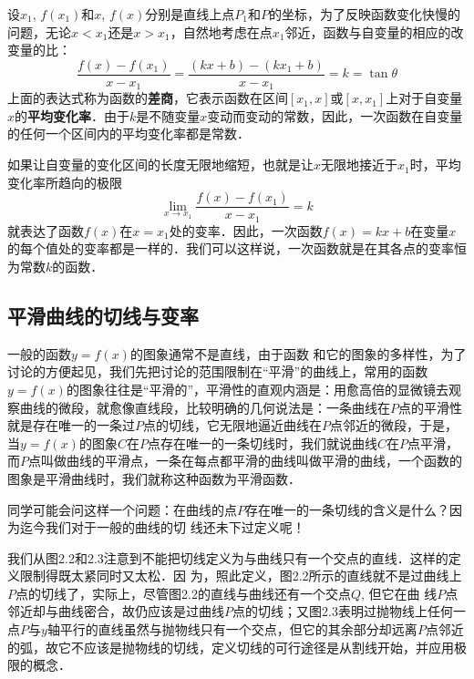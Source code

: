 设$x_1$, $f(x_1)$和$x$, $f(x)$分别是直线上点$P_1$和$P$的坐标，为了反映函数变化快慢的问题，无论$x<x_1$还是$x>x_1$，自然地考虑在点$x_1$邻近，函数与自变量的相应的改变量的比：
\[\frac{f(x)-f(x_1)}{x-x_1}=\frac{(kx+b)-(kx_1+b)}{x-x_1}=k=\tan\theta\]
上面的表达式称为函数的\textbf{差商}，它表示函数在区间$[x_1,x]$或$[x,x_1]$上对于自变量$x$的\textbf{平均变化率}．由于$k$是不随变量$x$变动而变动的常数，因此，一次函数在自变量的任何一个区间内的平均变化率都是常数．

如果让自变量的变化区间的长度无限地缩短，也就是让$x$无限地接近于$x_1$时，平均变化率所趋向的极限
\[\lim_{x\to x_1} \frac{f (x) -f (x_1)}{x-x_1} =k\]
就表达了函数$f(x)$在$x=x_1$处的变率．因此，一次函数$f(x)=kx+b$在变量$x$的每个值处的变率都是一样的．我们可以这样说，一次函数就是在其各点的变率恒为常数$k$的函数．

\subsection{平滑曲线的切线与变率}
一般的函数$y=f(x)$的图象通常不是直线，由于函数
和它的图象的多样性，为了讨论的方便起见，我们先把讨论的范围限制在“平滑”的曲线上，常用的函数$y=f(x)$的图象往往是“平滑的”，平滑性的直观内涵是：用愈高倍的显微镜去观察曲线的微段，就愈像直线段，比较明确的几何说法是：一条曲线在$P$点的平滑性就是存在唯一的一条过$P$点的切线，它无限地逼近曲线在$P$点邻近的微段，于是，当$y=f(x)$的图象$C$在$P$点存在唯一的一条切线时，我们就说曲线$C$在$P$点平滑，而$P$点叫做曲线的平滑点，一条在每点都平滑的曲线叫做平滑的曲线，一个函数的图象是平滑曲线时，我们就称这种函数为平滑函数．

同学可能会问这样一个问题：在曲线的点$P$存在唯一的一条切线的含义是什么？因为迄今我们对于一般的曲线的切
线还未下过定义呢！

我们从图2.2和2.3注意到不能把切线定义为与曲线只有一个交点的直线．这样的定义限制得既太紧同时又太松．因
为，照此定义，图2.2所示的直线就不是过曲线上$P$点的切线了，实际上，尽管图2.2的直线与曲线还有一个交点$Q$, 但它在曲
线$P$点邻近却与曲线密合，故仍应该是过曲线$P$点的切线；又图2.3表明过抛物线上任何一点$P$与$y$轴平行的直线虽然与抛物线只有一个交点，但它的其余部分却远离$P$点邻近的弧，故它不应该是抛物线的切线，定义切线的可行途径是从割线开始，并应用极限的概念．

